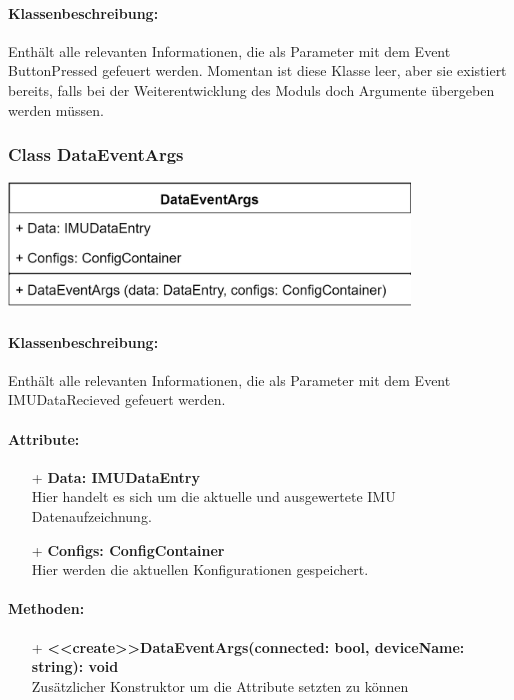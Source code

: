 \documentclass[a4paper,12pt]{article}
\begin{document}
\paragraph{Klassenbeschreibung:}
Enthält alle relevanten Informationen, die als Parameter mit dem Event ButtonPressed gefeuert werden. Momentan ist diese Klasse leer, aber sie existiert bereits, falls bei der Weiterentwicklung des Moduls doch Argumente übergeben werden müssen.

\begin{minipage}[b]{0.5\textwidth}
	\subsubsection{Class DataEventArgs}
	
	\end{minipage}
	\begin{minipage}[c]{0.5\textwidth}
	\includegraphics[width=0.8\textwidth]{bilder/BibPackageKlassen/DataEventArgs.png}
\end{minipage}
\paragraph{Klassenbeschreibung:}
Enthält alle relevanten Informationen, die als Parameter mit dem Event IMUDataRecieved gefeuert werden.

\paragraph{Attribute:}
\begin{itemize}
	\item[+] \textbf{Data: IMUDataEntry}\\Hier handelt es sich um die aktuelle und ausgewertete IMU Datenaufzeichnung.
	\item[+] \textbf{Configs: ConfigContainer}\\Hier werden die aktuellen Konfigurationen gespeichert.
\end{itemize}

\paragraph{Methoden:}
\begin{itemize}
	\item[+] \textbf{<<create>>DataEventArgs(connected: bool, deviceName: string): void}\\ Zusätzlicher Konstruktor um die Attribute setzten zu können
\end{itemize}
\end{document}
